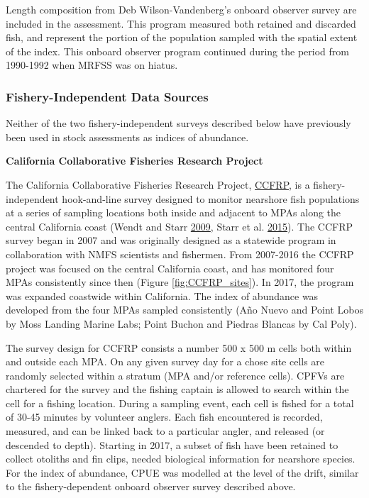 \documentclass[12pt,]{article}
\begin{document}
Length composition from Deb Wilson-Vandenberg's onboard observer survey
are included in the assessment. This program measured both retained and
discarded fish, and represent the portion of the population sampled with
the spatial extent of the index. This onboard observer program continued
during the period from 1990-1992 when MRFSS was on hiatus.

\subsubsection{Fishery-Independent Data
Sources}\label{fishery-independent-data-sources}

Neither of the two fishery-independent surveys described below have
previously been used in stock assessments as indices of abundance.

\textbf{California Collaborative Fisheries Research Project}

The California Collaborative Fisheries Research Project,
\href{https://www.mlml.calstate.edu/ccfrp/}{CCFRP}, is a
fishery-independent hook-and-line survey designed to monitor nearshore
fish populations at a series of sampling locations both inside and
adjacent to MPAs along the central California coast (Wendt and Starr
\protect\hyperlink{ref-Wendt2009}{2009}, Starr et al.
\protect\hyperlink{ref-Starr2015}{2015}). The CCFRP survey began in 2007
and was originally designed as a statewide program in collaboration with
NMFS scientists and fishermen. From 2007-2016 the CCFRP project was
focused on the central California coast, and has monitored four MPAs
consistently since then (Figure \ref{fig:CCFRP_sites}). In 2017, the
program was expanded coastwide within California. The index of abundance
was developed from the four MPAs sampled consistently (Año Nuevo and
Point Lobos by Moss Landing Marine Labs; Point Buchon and Piedras
Blancas by Cal Poly).

The survey design for CCFRP consists a number 500 x 500 m cells both
within and outside each MPA. On any given survey day for a chose site
cells are randomly selected within a stratum (MPA and/or reference
cells). CPFVs are chartered for the survey and the fishing captain is
allowed to search within the cell for a fishing location. During a
sampling event, each cell is fished for a total of 30-45 minutes by
volunteer anglers. Each fish encountered is recorded, measured, and can
be linked back to a particular angler, and released (or descended to
depth). Starting in 2017, a subset of fish have been retained to collect
otoliths and fin clips, needed biological information for nearshore
species. For the index of abundance, CPUE was modelled at the level of
the drift, similar to the fishery-dependent onboard observer survey
described above.
\end{document}
